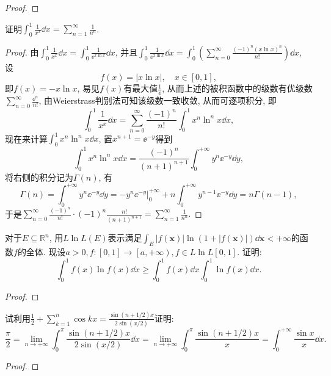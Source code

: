 \begin{quiza}
\begin{proof}
\end{proof}
\woe 证明\(\int_{0}^{1}\frac{1}{x^x}\dd x=\sum_{n=1}^{\infty}\frac{1}{n^n}\).
\begin{proof}
由\(\int_{0}^{1}\frac{1}{x^x}\dd x=\int_{0}^{1}\frac{1}{\ee^{x\ln x}}\dd x\), 并且\(\int_{0}^{1}\frac{1}{\ee^{x\ln x}}\dd x=\int_{0}^{1}\left(\sum_{n=0}^{\infty}\frac{(-1)^n(x\ln x)^n}{n!}\right)\dd x\), 设\[f(x)=\left|x\ln x\right|,\quad x\in[0,1],\]即\(f(x)=-x\ln x\), 易见\(f(x)\)有最大值\(\frac{1}{\ee}\), 从而上述的被积函数中的级数有优级数\(\sum_{n=0}^{\infty}\frac{\ee^n}{n!}\), 由Weierstrass判别法可知该级数一致收敛, 从而可逐项积分, 即\[\int_{0}^{1}\frac{1}{x^x}\dd x=\sum_{n=0}^{\infty}\frac{(-1)^n}{n!}\int_{0}^{1}x^n\ln^n x\dd x,\]现在来计算\(\int_{0}^{1}x^n\ln^n x\dd x\), 置\(x^{n+1}=\ee^{-y}\)得到\[\int_{0}^{1}x^n\ln^nx\dd x=\frac{(-1)^n}{(n+1)^{n+1}}\int_{0}^{+\infty}y^n\ee^{-y}\dd y,\]将右侧的积分记为\(\Gamma(n)\), 有\[\Gamma(n)=\int_{0}^{+\infty}y^n\ee^{-y}\dd y=\left.-y^n\ee^{-y}\right|_0^{+\infty}+n\int_{0}^{+\infty}y^{n-1}\ee^{-y}\dd y=n\Gamma(n-1),\]于是\(\sum_{n=0}^{\infty}\frac{(-1)^n}{n!}\cdot(-1)^n\frac{n!}{(n+1)^{n+1}}=\sum_{n=1}^{\infty}\frac{1}{n^n}.\)
\end{proof}
\woe 对于\(E\subseteq\mathbb{R}^n\), 用\(L\ln L(E)\)表示满足\(\int_E|f(\boldsymbol{x})|\ln\left(1+|f(\boldsymbol{x})|\right)\dd\boldsymbol{x}<+\infty\)的函数\(f\)的全体. 现设\(a>0,f:[0,1]\rightarrow\left[a,+\infty\right), f\in L\ln L[0,1]\). 证明:\[\int_{0}^{1}f(x)\ln f(x)\dd x\geqslant\int_{0}^{1}f(x)\dd x\int_{0}^{1}\ln f(x)\dd x.\]
\begin{proof}

\end{proof}
\woe 试利用\(\frac{1}{2}+\sum_{k=1}^{n}\cos kx=\frac{\sin\left(n+1/2\right)x}{2\sin(x/2)}\)证明:\[\frac{\pi}{2}=\lim_{n\rightarrow+\infty}\int_{0}^{\pi}\frac{\sin\left(n+1/2\right)x}{2\sin(x/2)}\dd x=\lim_{n\rightarrow+\infty}\int_{0}^{\pi}\frac{\sin\left(n+1/2\right)x}{x}=\int_{0}^{+\infty}\frac{\sin x}{x}\dd x.\]
\begin{proof}

\end{proof}
\end{quiza}
